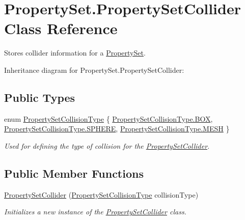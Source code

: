 \hypertarget{class_property_set_1_1_property_set_collider}{}\section{Property\+Set.\+Property\+Set\+Collider Class Reference}
\label{class_property_set_1_1_property_set_collider}


Stores collider information for a \hyperlink{struct_property_set}{Property\+Set}.  




Inheritance diagram for Property\+Set.\+Property\+Set\+Collider\+:
\subsection*{Public Types}
\begin{DoxyCompactItemize}
\item 
enum \hyperlink{class_property_set_1_1_property_set_collider_a6c640ed4b9ab14dffc7da13b1e4bf51e}{Property\+Set\+Collision\+Type} \{ \hyperlink{class_property_set_1_1_property_set_collider_a6c640ed4b9ab14dffc7da13b1e4bf51eae657cce1913c857166b0475f18668ef5}{Property\+Set\+Collision\+Type.\+B\+OX}, 
\hyperlink{class_property_set_1_1_property_set_collider_a6c640ed4b9ab14dffc7da13b1e4bf51ea6f7cea7381e843e2ee0338b4a92b0d43}{Property\+Set\+Collision\+Type.\+S\+P\+H\+E\+RE}, 
\hyperlink{class_property_set_1_1_property_set_collider_a6c640ed4b9ab14dffc7da13b1e4bf51ea5b65fe46c5dd90ebcec69c472c3be1d9}{Property\+Set\+Collision\+Type.\+M\+E\+SH}
 \}\begin{DoxyCompactList}\small\item\em Used for defining the type of collision for the \hyperlink{class_property_set_1_1_property_set_collider}{Property\+Set\+Collider}. \end{DoxyCompactList}
\end{DoxyCompactItemize}
\subsection*{Public Member Functions}
\begin{DoxyCompactItemize}
\item 
\hyperlink{class_property_set_1_1_property_set_collider_a47197ffe129e18b56ee893e3f1a5832e}{Property\+Set\+Collider} (\hyperlink{class_property_set_1_1_property_set_collider_a6c640ed4b9ab14dffc7da13b1e4bf51e}{Property\+Set\+Collision\+Type} collision\+Type)
\begin{DoxyCompactList}\small\item\em Initializes a new instance of the \hyperlink{class_property_set_1_1_property_set_collider}{Property\+Set\+Collider} class. \end{DoxyCompactList}\end{DoxyCompactItemize}
